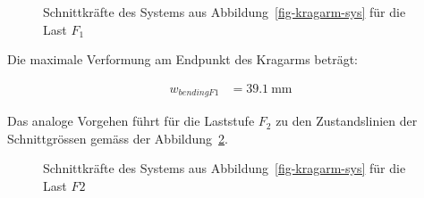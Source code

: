 \documentclass[
  11pt,
  letterpaper,
]{scrreprt}
\begin{document}
\begin{figure}[H]


\caption{\label{fig-skkragarmreal}Schnittkräfte des Systems aus
Abbildung~\ref{fig-kragarm-sys} für die Last \(F_1\)}

\end{figure}%

Die maximale Verformung am Endpunkt des Kragarms beträgt:

$$
\begin{aligned}
w_{bendingF1} &= 39.1\ \mathrm{mm} \;
\end{aligned}
$$

Das analoge Vorgehen führt für die Laststufe \(F_2\) zu den
Zustandslinien der Schnittgrössen gemäss der
Abbildung~\ref{fig-skkragarmreal_high}.

\begin{figure}[H]


\caption{\label{fig-skkragarmreal_high}Schnittkräfte des Systems aus
Abbildung~\ref{fig-kragarm-sys} für die Last \(F2\)}

\end{figure}%
\end{document}

